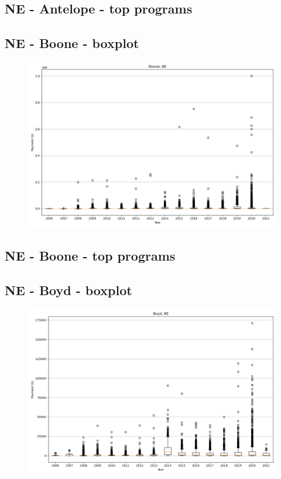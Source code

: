 \subsection*{NE - Antelope - top programs}

\newpage
\subsection*{NE - Boone - boxplot}
\begin{figure}[h]
\centering
\includegraphics[width=7in]{../output/boxplots/counties/Boone-NE_boxplot.png}
\end{figure}


\subsection*{NE - Boone - top programs}

\newpage
\subsection*{NE - Boyd - boxplot}
\begin{figure}[h]
\centering
\includegraphics[width=7in]{../output/boxplots/counties/Boyd-NE_boxplot.png}
\end{figure}



